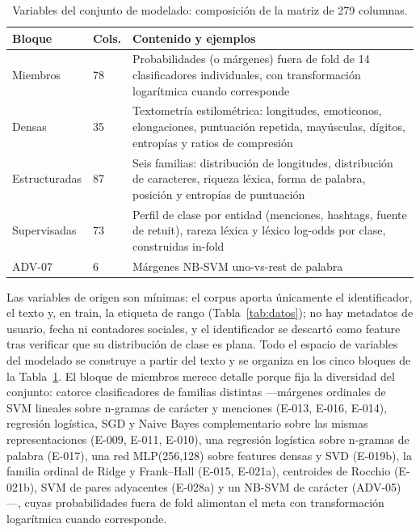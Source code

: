 \documentclass[journal]{IEEEtai}
\begin{document}
\begin{table}[htbp]
\centering
\caption{Variables del conjunto de modelado: composici\'on de la matriz de 279 columnas.}
\label{tab:variables}
\footnotesize
\setlength{\tabcolsep}{3pt}
\begin{tabular}{p{}p{}p{}}
\toprule
Bloque & Cols. & Contenido y ejemplos \\
\midrule
Miembros & 78 & Probabilidades (o m\'argenes) fuera de fold de 14 clasificadores individuales, con transformaci\'on logar\'itmica cuando corresponde \\
Densas & 35 & Textometr\'ia estilom\'etrica: longitudes, emoticonos, elongaciones, puntuaci\'on repetida, may\'usculas, d\'igitos, entrop\'ias y ratios de compresi\'on \\
Estructuradas & 87 & Seis familias: distribuci\'on de longitudes, distribuci\'on de caracteres, riqueza l\'exica, forma de palabra, posici\'on y entrop\'ias de puntuaci\'on \\
Supervisadas & 73 & Perfil de clase por entidad (menciones, hashtags, fuente de retuit), rareza l\'exica y l\'exico log-odds por clase, construidas in-fold \\
ADV-07 & 6 & M\'argenes NB-SVM uno-vs-rest de palabra \\
\bottomrule
\end{tabular}
\end{table}

Las variables de origen son m\'inimas: el corpus aporta \'unicamente el identificador, el texto y,
en train, la etiqueta de rango (Tabla~\ref{tab:datos}); no hay metadatos de usuario, fecha ni contadores
sociales, y el identificador se descart\'o como feature tras verificar que su distribuci\'on de
clase es plana. Todo el espacio de variables del modelado se construye a partir del texto y se
organiza en los cinco bloques de la Tabla~\ref{tab:variables}. El bloque de miembros merece
detalle porque fija la diversidad del conjunto: catorce clasificadores de familias distintas
---m\'argenes ordinales de SVM lineales sobre n-gramas de car\'acter y menciones (E-013, E-016,
E-014), regresi\'on log\'istica, SGD y Naive Bayes complementario sobre las mismas
representaciones (E-009, E-011, E-010), una regresi\'on log\'istica sobre n-gramas de palabra
(E-017), una red MLP(256,128) sobre features densas y SVD (E-019b), la familia ordinal de Ridge
y Frank--Hall (E-015, E-021a), centroides de Rocchio (E-021b), SVM de pares adyacentes (E-028a)
y un NB-SVM de car\'acter (ADV-05)---, cuyas probabilidades fuera de fold alimentan el meta con
transformaci\'on logar\'itmica cuando corresponde.
\end{document}
